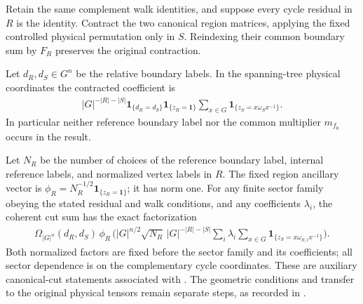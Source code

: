 \begin{lemma}%
    \label{thm:peps_controlled_projector_cut_boundary_factor}
    \leanok
    Retain the same complement walk identities, and suppose
    every cycle residual in $R$ is the identity. Contract the
    two canonical region matrices, applying the fixed controlled
    physical permutation only in $S$. Reindexing their common boundary
    sum by $F_R$ preserves the original contraction.

    Let $d_R,d_S\in G^n$ be the relative boundary labels. In the
    spanning-tree physical coordinates the contracted
    coefficient is
    \begin{align}
        |G|^{-|R|-|S|}\mathbf 1_{\{d_R=d_S\}}
        \mathbf 1_{\{z_R=\mathbf 1\}}
        \sum_{x\in G}\mathbf 1_{\{z_S=x\omega_Sx^{-1}\}}.
        \label{eq:peps_controlled_canonical_cut_factor}
    \end{align}
    In particular neither reference boundary label nor the common
    multiplier $m_{f_0}$ occurs in the result.

    Let $N_R$ be the number of choices of the reference boundary label,
    internal reference labels, and normalized vertex labels in $R$.
    The fixed region ancillary vector is
    $\phi_R=N_R^{-1/2}\mathbf 1_{\{z_R=\mathbf 1\}}$; it has norm
    one. For any finite sector family obeying the stated
    residual and walk conditions, and any coefficients $\lambda_i$,
    the coherent cut sum has the exact factorization
    \begin{align}
        \Omega_{|G|^n}(d_R,d_S)\,\phi_R\,
        \biggl(|G|^{n/2}\sqrt{N_R}\,|G|^{-|R|-|S|}
        \sum_i\lambda_i\sum_{x\in G}
        \mathbf 1_{\{z_S=x\omega_{S,i}x^{-1}\}}\biggr).
    \end{align}
    Both normalized factors are fixed before the sector family and
    its coefficients; all sector dependence is on the complementary
    cycle coordinates. These are auxiliary canonical-cut statements
    associated with \cite[Theorem~6.9]{Schuch2010PEPS}. The
    geometric conditions and transfer to the original physical
    tensors remain separate steps, as recorded in
    \cite{gap:rmp_peps_quantum_double_g_isometry}.
\end{lemma}
